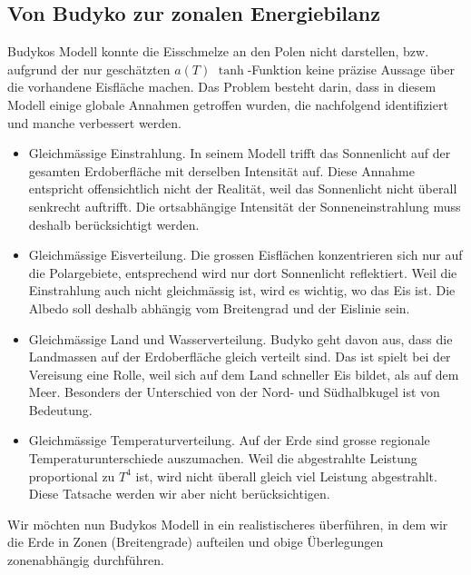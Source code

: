 \begin{refsection}
\section{Von Budyko zur zonalen Energiebilanz}
Budykos Modell konnte die Eisschmelze an den Polen nicht darstellen, bzw. aufgrund der nur geschätzten $a(T)$ $\tanh$-Funktion keine präzise Aussage über die vorhandene Eisfläche machen. Das Problem besteht darin, dass in diesem Modell einige globale Annahmen getroffen wurden, die nachfolgend identifiziert und manche verbessert werden.
\begin{itemize}
	\item Gleichmässige Einstrahlung. In seinem Modell trifft das Sonnenlicht auf der gesamten Erdoberfläche mit derselben Intensität auf. Diese Annahme entspricht offensichtlich nicht der Realität, weil das Sonnenlicht nicht überall senkrecht auftrifft. Die ortsabhängige Intensität der Sonneneinstrahlung muss deshalb berücksichtigt werden.
	\item Gleichmässige Eisverteilung. Die grossen Eisflächen konzentrieren sich nur auf die Polargebiete, entsprechend wird nur dort Sonnenlicht reflektiert. Weil die Einstrahlung auch nicht gleichmässig ist, wird es wichtig, wo das Eis ist. Die Albedo soll deshalb abhängig vom Breitengrad und der Eislinie sein.
	\item Gleichmässige Land und Wasserverteilung. Budyko geht davon aus, dass die Landmassen auf der Erdoberfläche gleich verteilt sind. Das ist spielt bei der Vereisung eine Rolle, weil sich auf dem Land schneller Eis bildet, als auf dem Meer. Besonders der Unterschied von der Nord- und Südhalbkugel ist von Bedeutung.
	\item Gleichmässige Temperaturverteilung. Auf der Erde sind grosse regionale Temperaturunterschiede auszumachen. Weil die abgestrahlte Leistung proportional zu $T^4$ ist, wird nicht überall gleich viel Leistung abgestrahlt. Diese Tatsache werden wir aber nicht berücksichtigen.
\end{itemize}
Wir möchten nun Budykos Modell in ein realistischeres überführen, in dem wir die Erde in Zonen (Breitengrade) aufteilen und obige Überlegungen zonenabhängig durchführen.

\end{refsection}
